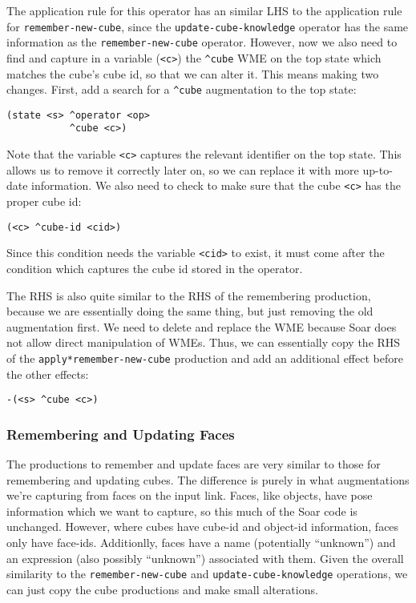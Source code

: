 The application rule for this operator has an similar LHS to the
application rule for \texttt{remember-new-cube}, since the
\texttt{update-cube-knowledge} operator has the same information as the
\texttt{remember-new-cube} operator. However, now we also need to find
and capture in a variable (\texttt{\textless{}c\textgreater{}}) the
\texttt{\^{}cube} WME on the top state which matches the cube's cube id,
so that we can alter it. This means making two changes. First, add a
search for a \texttt{\^{}cube} augmentation to the top state:

\begin{verbatim}
(state <s> ^operator <op>
           ^cube <c>)
\end{verbatim}

Note that the variable \texttt{\textless{}c\textgreater{}} captures the
relevant identifier on the top state. This allows us to remove it
correctly later on, so we can replace it with more up-to-date
information. We also need to check to make sure that the cube
\texttt{\textless{}c\textgreater{}} has the proper cube id:

\begin{verbatim}
(<c> ^cube-id <cid>)
\end{verbatim}

Since this condition needs the variable
\texttt{\textless{}cid\textgreater{}} to exist, it must come after the
condition which captures the cube id stored in the operator.

The RHS is also quite similar to the RHS of the remembering production,
because we are essentially doing the same thing, but just removing the
old augmentation first. We need to delete and replace the WME because
Soar does not allow direct manipulation of WMEs. Thus, we can
essentially copy the RHS of the \texttt{apply*remember-new-cube}
production and add an additional effect before the other effects:

\begin{verbatim}
-(<s> ^cube <c>)
\end{verbatim}

\hypertarget{remembering-and-updating-faces}{%
\subsubsection{Remembering and Updating
Faces}\label{remembering-and-updating-faces}}

The productions to remember and update faces are very similar to those
for remembering and updating cubes. The difference is purely in what
augmentations we're capturing from faces on the input link. Faces, like
objects, have pose information which we want to capture, so this much of
the Soar code is unchanged. However, where cubes have cube-id and
object-id information, faces only have face-ids. Additionlly, faces have
a name (potentially ``unknown'') and an expression (also possibly
``unknown'') associated with them. Given the overall similarity to the
\texttt{remember-new-cube} and \texttt{update-cube-knowledge}
operations, we can just copy the cube productions and make small
alterations.

